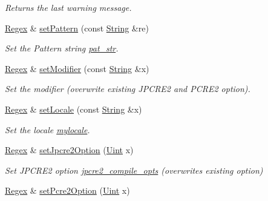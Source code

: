 \begin{DoxyCompactItemize}
\begin{DoxyCompactList}\small\item\em Returns the last warning message. \end{DoxyCompactList}\item 
\hyperlink{classjpcre2_1_1Regex}{Regex} \& \hyperlink{classjpcre2_1_1Regex_a85d9a514ea86ae68533223adac6c6bd8_a85d9a514ea86ae68533223adac6c6bd8}{set\+Pattern} (const \hyperlink{namespacejpcre2_a91f03070152fb228bc116c5a737f1d16}{String} \&re)
\begin{DoxyCompactList}\small\item\em Set the Pattern string \hyperlink{classjpcre2_1_1Regex_a0bceb85b6dbba355b56b5cc312214435}{pat\+\_\+str}. \end{DoxyCompactList}\item 
\hyperlink{classjpcre2_1_1Regex}{Regex} \& \hyperlink{classjpcre2_1_1Regex_aed9865b58c60945e19f36fa310f5a595_aed9865b58c60945e19f36fa310f5a595}{set\+Modifier} (const \hyperlink{namespacejpcre2_a91f03070152fb228bc116c5a737f1d16}{String} \&x)
\begin{DoxyCompactList}\small\item\em Set the modifier (overwrite existing J\+P\+C\+R\+E2 and P\+C\+R\+E2 option). \end{DoxyCompactList}\item 
\hyperlink{classjpcre2_1_1Regex}{Regex} \& \hyperlink{classjpcre2_1_1Regex_a56721534519e5cb436337043eee8f42d_a56721534519e5cb436337043eee8f42d}{set\+Locale} (const \hyperlink{namespacejpcre2_a91f03070152fb228bc116c5a737f1d16}{String} \&x)
\begin{DoxyCompactList}\small\item\em Set the locale \hyperlink{classjpcre2_1_1Regex_a92a3ad992cade62d103248302f7e2f2d}{mylocale}. \end{DoxyCompactList}\item 
\hyperlink{classjpcre2_1_1Regex}{Regex} \& \hyperlink{classjpcre2_1_1Regex_a031617a19638ef752dcd2b29fa3464d5_a031617a19638ef752dcd2b29fa3464d5}{set\+Jpcre2\+Option} (\hyperlink{namespacejpcre2_a078242d38221a13fb3543b9edd78c099}{Uint} x)
\begin{DoxyCompactList}\small\item\em Set J\+P\+C\+R\+E2 option \hyperlink{classjpcre2_1_1Regex_abdd26c3bc1c3132f0aa73dde1690a7ef}{jpcre2\+\_\+compile\+\_\+opts} (overwrites existing option) \end{DoxyCompactList}\item 
\hyperlink{classjpcre2_1_1Regex}{Regex} \& \hyperlink{classjpcre2_1_1Regex_acdc6f97f4030ae109c4e1a4e2310bceb_acdc6f97f4030ae109c4e1a4e2310bceb}{set\+Pcre2\+Option} (\hyperlink{namespacejpcre2_a078242d38221a13fb3543b9edd78c099}{Uint} x)

\end{DoxyCompactItemize}
